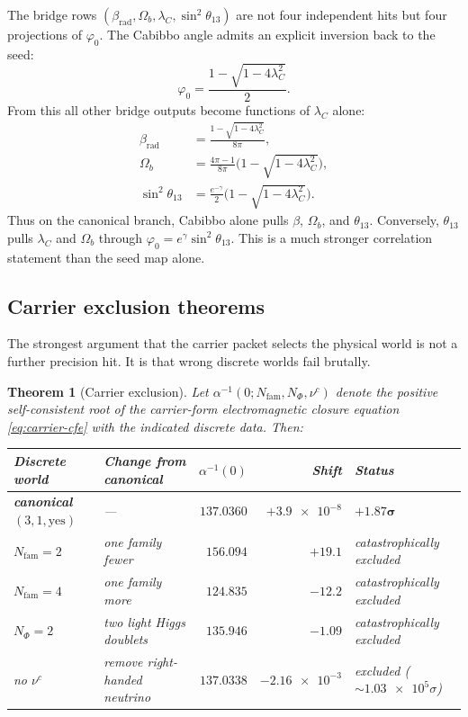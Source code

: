 \documentclass[11pt,a4paper]{article}
\newtheorem{theorem}{Theorem}[section]
\theoremstyle{definition}
\theoremstyle{remark}
\newcommand{\phiz}{\varphi_0}
\begin{document}
The bridge rows $(\beta_{\mathrm{rad}},\Omega_b,\lambda_C,\sin^2\theta_{13})$ are not four independent hits but four projections of $\phiz$. The Cabibbo angle admits an explicit inversion back to the seed:
\begin{equation}
\label{eq:cabibbo-inversion}
\phiz=\frac{1-\sqrt{1-4\lambda_C^2}}{2}.
\end{equation}
From this all other bridge outputs become functions of $\lambda_C$ alone:
\begin{equation}
\label{eq:lambda-c-master}
\begin{aligned}
\beta_{\mathrm{rad}}&=\frac{1-\sqrt{1-4\lambda_C^2}}{8\pi},\\
\Omega_b&=\frac{4\pi-1}{8\pi}\bigl(1-\sqrt{1-4\lambda_C^2}\bigr),\\
\sin^2\theta_{13}&=\frac{e^{-\gamma}}{2}\bigl(1-\sqrt{1-4\lambda_C^2}\bigr).
\end{aligned}
\end{equation}
Thus on the canonical branch, Cabibbo alone pulls $\beta$, $\Omega_b$, and $\theta_{13}$. Conversely, $\theta_{13}$ pulls $\lambda_C$ and $\Omega_b$ through $\phiz=e^\gamma\sin^2\theta_{13}$. This is a much stronger correlation statement than the seed map alone.

\subsection{Carrier exclusion theorems}

The strongest argument that the carrier packet selects the physical world is not a further precision hit. It is that wrong discrete worlds fail brutally.

\begin{theorem}[Carrier exclusion]
\label{thm:carrier-exclusion}
Let $\alpha^{-1}(0;N_{\mathrm{fam}},N_\Phi,\nu^c)$ denote the positive self-consistent root of the carrier-form electromagnetic closure equation \eqref{eq:carrier-cfe} with the indicated discrete data. Then:
\begin{center}
\small
\begin{tabular}{@{}llrrl@{}}
\toprule
Discrete world & Change from canonical & $\alpha^{-1}(0)$ & Shift & Status \\
\midrule
\textbf{canonical $(3,1,\text{yes})$} & --- & $\mathbf{\num{137.0360}}$ & $+\num{3.9e-8}$ & $\mathbf{+1.87\sigma}$ \\
$N_{\mathrm{fam}}=2$ & one family fewer & $\num{156.094}$ & $+19.1$ & catastrophically excluded \\
$N_{\mathrm{fam}}=4$ & one family more & $\num{124.835}$ & $-12.2$ & catastrophically excluded \\
$N_\Phi=2$ & two light Higgs doublets & $\num{135.946}$ & $-1.09$ & catastrophically excluded \\
no $\nu^c$ & remove right-handed neutrino & $\num{137.0338}$ & $-\num{2.16e-3}$ & excluded (${\sim}\num{1.03e5}\sigma$) \\
\bottomrule
\end{tabular}
\end{center}
\end{theorem}
\end{document}
